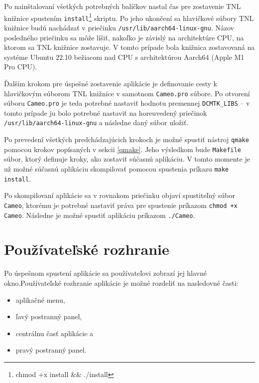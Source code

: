 {Po nainštalovaní všetkých potrebných balíčkov nastal čas pre zostavenie TNL knižnice spustením \texttt{install}\footnote{chmod +x install \&\& ./install} skriptu. Po jeho ukončení sa hlavičkové súbory TNL knižnice budú nachádzať v priečinku \texttt{/usr/lib/aarch64-linux-gnu}. Názov posledného priečinku sa môže líšiť, nakoľko je závislý na architektúre CPU, na ktorom sa TNL knižnice zostavuje. V tomto prípade bola knižnica zostavovaná na systéme Ubuntu 22.10 bežiacom nad CPU s architektúrou Aarch64 (Apple M1 Pro CPU).

Ďalším krokom pre úspešné zostavenie aplikácie je definovanie cesty k hlavičkovým súborom TNL knižnice v samotnom \texttt{Cameo.pro} súbore. Po otvorení súboru \texttt{Cameo.pro} je teda potrebné nastaviť hodnotu premennej \lstinline{DCMTK_LIBS} -- v tomto prípade ju bolo potrebné nastaviť na horeuvedený priečinok \newline \texttt{/usr/lib/aarch64-linux-gnu} a následne daný súbor uložiť.

Po prevedení všetkých predchádzajúcich krokoch je možné spustiť nástroj \texttt{qmake} pomocou krokov popísaných v sekcii \ref{qmake}. Jeho výsledkom bude \newline \texttt{Makefile} súbor, ktorý definuje kroky, ako zostaviť súčasnú aplikáciu. V tomto momente je už možné súčasnú aplikáciu skompilovať pomocou spustenia príkazu \texttt{make install}.

Po skompilovaní aplikácie sa v rovnakom priečinku objaví spustiteľný súbor \texttt{Cameo}, ktorému je potrebné nastaviť práva pre spustenie príkazom \texttt{chmod +x Cameo}. Následne je možné spustiť aplikáciu príkazom \texttt{./Cameo}. \clearpage

\section {Používateľské rozhranie}\label{old_ui}
Po úspešnom spustení aplikácie sa používateľovi zobrazí jej hlavné okno.\newline Používateľské rozhranie aplikácie je možné rozdeliť na nasledovné časti:
\begin {itemize}
\item {aplikačné menu,}
\item {ľavý postranný panel,}
\item {centrálnu časť aplikácie a}
\item {pravý postranný panel.}
\end {itemize}

}
